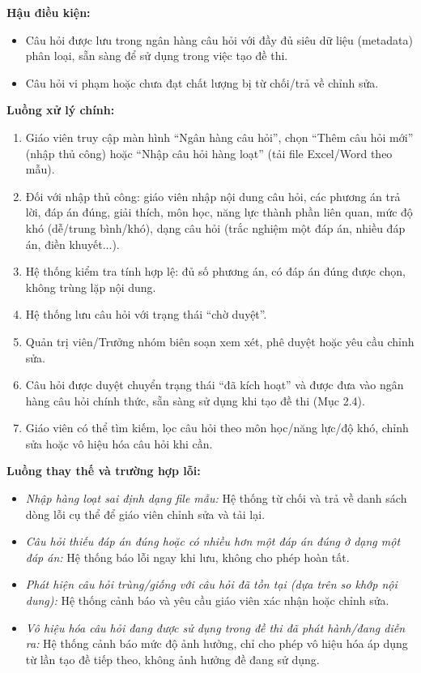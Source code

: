 \documentclass[12pt,a4paper]{article}
\newcommand{\ucfield}[2]{\noindent\textbf{#1: } #2\par\vspace{0.35em}}
\begin{document}
	\ucfield{Hậu điều kiện}{
		\begin{itemize}[nosep]
			\item Câu hỏi được lưu trong ngân hàng câu hỏi với đầy đủ siêu dữ liệu (metadata) phân loại, sẵn sàng để sử dụng trong việc tạo đề thi.
			\item Câu hỏi vi phạm hoặc chưa đạt chất lượng bị từ chối/trả về chỉnh sửa.
	\end{itemize}}
	
	\ucfield{Luồng xử lý chính}{
		\begin{enumerate}[nosep]
			\item Giáo viên truy cập màn hình ``Ngân hàng câu hỏi'', chọn ``Thêm câu hỏi mới'' (nhập thủ công) hoặc ``Nhập câu hỏi hàng loạt'' (tải file Excel/Word theo mẫu).
			\item Đối với nhập thủ công: giáo viên nhập nội dung câu hỏi, các phương án trả lời, đáp án đúng, giải thích, môn học, năng lực thành phần liên quan, mức độ khó (dễ/trung bình/khó), dạng câu hỏi (trắc nghiệm một đáp án, nhiều đáp án, điền khuyết...).
			\item Hệ thống kiểm tra tính hợp lệ: đủ số phương án, có đáp án đúng được chọn, không trùng lặp nội dung.
			\item Hệ thống lưu câu hỏi với trạng thái ``chờ duyệt''.
			\item Quản trị viên/Trưởng nhóm biên soạn xem xét, phê duyệt hoặc yêu cầu chỉnh sửa.
			\item Câu hỏi được duyệt chuyển trạng thái ``đã kích hoạt'' và được đưa vào ngân hàng câu hỏi chính thức, sẵn sàng sử dụng khi tạo đề thi (Mục 2.4).
			\item Giáo viên có thể tìm kiếm, lọc câu hỏi theo môn học/năng lực/độ khó, chỉnh sửa hoặc vô hiệu hóa câu hỏi khi cần.
	\end{enumerate}}
	
	\ucfield{Luồng thay thế và trường hợp lỗi}{
		\begin{itemize}[nosep]
			\item \textit{Nhập hàng loạt sai định dạng file mẫu:} Hệ thống từ chối và trả về danh sách dòng lỗi cụ thể để giáo viên chỉnh sửa và tải lại.
			\item \textit{Câu hỏi thiếu đáp án đúng hoặc có nhiều hơn một đáp án đúng ở dạng một đáp án:} Hệ thống báo lỗi ngay khi lưu, không cho phép hoàn tất.
			\item \textit{Phát hiện câu hỏi trùng/giống với câu hỏi đã tồn tại (dựa trên so khớp nội dung):} Hệ thống cảnh báo và yêu cầu giáo viên xác nhận hoặc chỉnh sửa.
			\item \textit{Vô hiệu hóa câu hỏi đang được sử dụng trong đề thi đã phát hành/đang diễn ra:} Hệ thống cảnh báo mức độ ảnh hưởng, chỉ cho phép vô hiệu hóa áp dụng từ lần tạo đề tiếp theo, không ảnh hưởng đề đang sử dụng.
	\end{itemize}}
	
\end{document}
